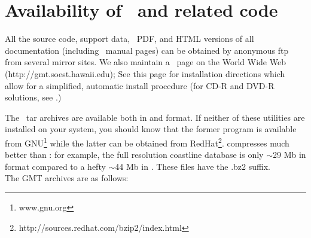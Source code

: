 %
%
\chapter{Availability of \gmt\ and related code}
\label{app:D}
\thispagestyle{headings}

All the source code, support data, \PS\, PDF,
and HTML versions of all documentation (including \UNIX\
manual pages) can be obtained by anonymous
ftp from several mirror sites.  We also maintain a \GMT\
page on the World Wide Web (http://gmt.soest.hawaii.edu);
See this page for installation directions 
which allow for a simplified, automatic install procedure
(for CD-R and DVD-R solutions, see .)

The \GMT\ tar archives are available both in \progname{gzip}
and  format.  If neither of these utilities
are installed on your system, you should know that the former
program is available from GNU\footnote{www.gnu.org} while the
latter can be obtained from RedHat\footnote{http://sources.redhat.com/bzip2/index.html}.
 compresses much better than :
for example, the full resolution coastline database is only
$\sim$29 Mb in \progname{bzip2} format compared to a hefty
$\sim$44 Mb in \progname{gzip}.  These files have the .bz2 suffix. \\

The GMT archives are as follows:

